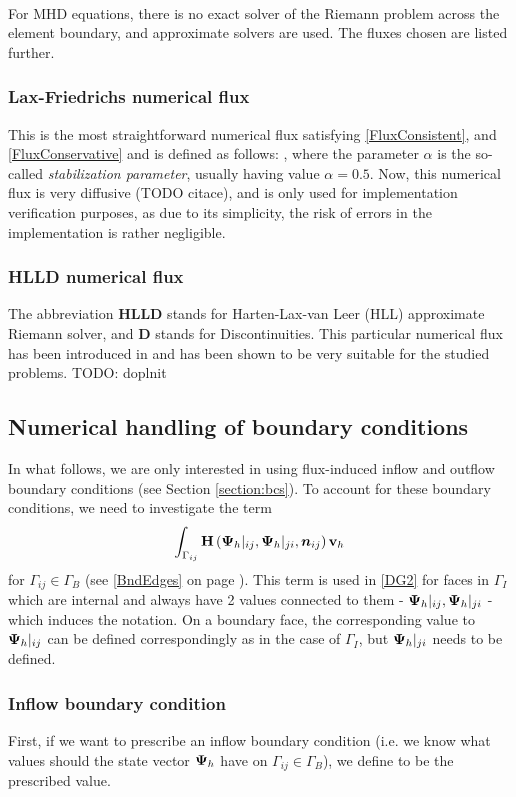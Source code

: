 \paragraph{}
For MHD equations, there is no exact solver of the Riemann problem across the element boundary, and approximate solvers are used. The fluxes chosen are listed further.
\subsubsection{Lax-Friedrichs numerical flux}
This is the most straightforward numerical flux satisfying \ref{FluxConsistent}, and \ref{FluxConservative} and is defined as follows:
\be
,
\ee
where the parameter $\alpha$ is the so-called \textit{stabilization parameter}, usually having value $\alpha = 0.5$. Now, this numerical flux is very diffusive (TODO citace), and is only used for implementation verification purposes, as due to its simplicity, the risk of errors in the implementation is rather negligible.
\subsubsection{HLLD numerical flux}
The abbreviation \textbf{HLLD} stands for Harten-Lax-van Leer (HLL) approximate Riemann solver, and \textbf{D} stands for Discontinuities.
This particular numerical flux has been introduced in \citep{hlld} and has been shown to be very suitable for the studied problems.
TODO: doplnit
\subsection{Numerical handling of boundary conditions}
In what follows, we are only interested in using flux-induced inflow and outflow boundary conditions (see Section \ref{section:bcs}).
To account for these boundary conditions, we need to investigate the term
$$
\int_{\Gamma_{ij}} \mathrm{\mathbf{H}}\left({\mathrm{\mathbf{\Psi}}_h}|_{ij}, {\mathrm{\mathbf{\Psi}}_h}|_{ji}, \mbox{\boldmath $n$}_{ij}\right) \mathrm{\mathbf{v}}_h
$$
for $\Gamma_{ij} \in \Gamma_B$ (see \ref{BndEdges} on page \pageref{BndEdges}).
This term is used in \ref{DG2} for faces in $\Gamma_I$ which are internal and always have 2 values connected to them - $\mathrm{\mathbf{\Psi}}_h|_{ij}, {\mathrm{\mathbf{\Psi}}_h}|_{ji}$ - which induces the notation. On a boundary face, the corresponding value to ${\mathrm{\mathbf{\Psi}}_h}|_{ij}$ can be defined correspondingly as in the case of $\Gamma_I$, but ${\mathrm{\mathbf{\Psi}}_h}|_{ji}$ needs to be defined.
\subsubsection{Inflow boundary condition}
First, if we want to prescribe an inflow boundary condition (i.e. we know what values should the state vector $\mathrm{\mathbf{\Psi}}_h$ have on ${\Gamma_{ij}}\in\Gamma_B$), we define
\be
\label{BC1} 
\ee
to be the prescribed value.

